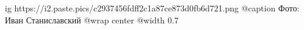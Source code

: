  
 
 
 
 

\ifcmt
  ig https://i2.paste.pics/c2937456fdff2c1a87ce873d0fb6d721.png
	@caption Фото: Иван Станиславский
  @wrap center
  @width 0.7
\fi
